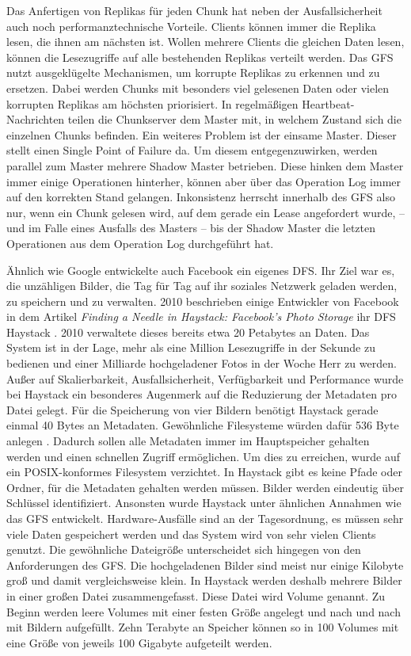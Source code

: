 \documentclass[12pt,oneside,a4paper,parskip]{scrbook}
\begin{document}
Das Anfertigen von Replikas für jeden Chunk hat neben der Ausfallsicherheit auch noch performanztechnische Vorteile. Clients können immer die Replika lesen, die ihnen am nächsten ist. Wollen mehrere Clients die gleichen Daten lesen, können die Lesezugriffe auf alle bestehenden Replikas verteilt werden. Das GFS nutzt ausgeklügelte Mechanismen, um korrupte Replikas zu erkennen und zu ersetzen. Dabei werden Chunks mit besonders viel gelesenen Daten oder vielen korrupten Replikas am höchsten priorisiert. In regelmäßigen Heartbeat-Nachrichten teilen die Chunkserver dem Master mit, in welchem Zustand sich die einzelnen Chunks befinden. Ein weiteres Problem ist der einsame Master. Dieser stellt einen Single Point of Failure da. Um diesem entgegenzuwirken, werden parallel zum Master mehrere Shadow Master betrieben. Diese hinken dem Master immer einige Operationen hinterher, können aber über das Operation Log immer auf den korrekten Stand gelangen. Inkonsistenz herrscht innerhalb des GFS also nur, wenn ein Chunk gelesen wird, auf dem gerade ein Lease angefordert wurde, – und im Falle eines Ausfalls des Masters – bis der Shadow Master die letzten Operationen aus dem Operation Log durchgeführt hat.

Ähnlich wie Google entwickelte auch Facebook ein eigenes DFS. Ihr Ziel war es, die unzähligen Bilder, die Tag für Tag auf ihr soziales Netzwerk geladen werden, zu speichern und zu verwalten. 2010 beschrieben einige Entwickler von Facebook in dem Artikel \textit{Finding a Needle in Haystack: Facebook's Photo Storage} ihr DFS Haystack \cite{haystack}. 2010 verwaltete dieses bereits etwa 20 Petabytes an Daten. Das System ist in der Lage, mehr als eine Million Lesezugriffe in der Sekunde zu bedienen und einer Milliarde hochgeladener Fotos in der Woche Herr zu werden. Außer auf Skalierbarkeit, Ausfallsicherheit, Verfügbarkeit und Performance wurde bei Haystack ein besonderes Augenmerk auf die Reduzierung der Metadaten pro Datei gelegt. Für die Speicherung von vier Bildern benötigt Haystack gerade einmal 40 Bytes an Metadaten. Gewöhnliche Filesysteme würden dafür 536 Byte anlegen \cite{haystack}. Dadurch sollen alle Metadaten immer im Hauptspeicher gehalten werden und einen schnellen Zugriff ermöglichen. Um dies zu erreichen, wurde auf ein POSIX-konformes Filesystem verzichtet. In Haystack gibt es keine Pfade oder Ordner, für die Metadaten gehalten werden müssen. Bilder werden eindeutig über Schlüssel identifiziert. Ansonsten wurde Haystack unter ähnlichen Annahmen wie das GFS entwickelt. Hardware-Ausfälle sind an der Tagesordnung, es müssen sehr viele Daten gespeichert werden und das System wird von sehr vielen Clients genutzt. Die gewöhnliche Dateigröße unterscheidet sich hingegen von den Anforderungen des GFS. Die hochgeladenen Bilder sind meist nur einige Kilobyte groß und damit vergleichsweise klein. In Haystack werden deshalb mehrere Bilder in einer großen Datei zusammengefasst. Diese Datei wird Volume genannt. Zu Beginn werden leere Volumes mit einer festen Größe angelegt und nach und nach mit Bildern aufgefüllt. Zehn Terabyte an Speicher können so in 100 Volumes mit eine Größe von jeweils 100 Gigabyte aufgeteilt werden.
\end{document}

